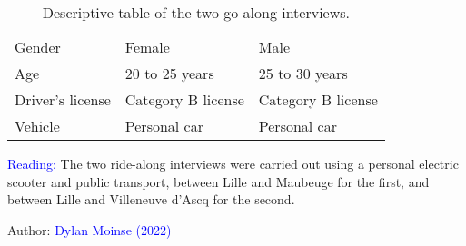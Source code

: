 \begin{table}[h!]
{\begin{tabular}{p{}p{}p{}}
\small{Gender} & \small{Female} & \small{Male}\\
\small{Age} & \small{20 to 25 years} & \small{25 to 30 years}\\
\small{Driver's license} & \small{Category B license} & \small{Category B license}\\
\small{Vehicle} & \small{Personal car} & \small{Personal car}\\
        \hline
        \end{tabular}}
    \caption{Descriptive table of the two go-along interviews.}
    \label{table-chap3:details-parcours-commentes}
        \vspace{5pt}
        \begin{flushleft}\scriptsize{
        \textcolor{blue}{Reading:} The two ride-along interviews were carried out using a personal electric scooter and public transport, between Lille and Maubeuge for the first, and between Lille and Villeneuve d'Ascq for the second.
        }\end{flushleft}
        \begin{flushright}\scriptsize{
        Author: \textcolor{blue}{Dylan Moinse (2022)}
        }\end{flushright}
        \end{table}